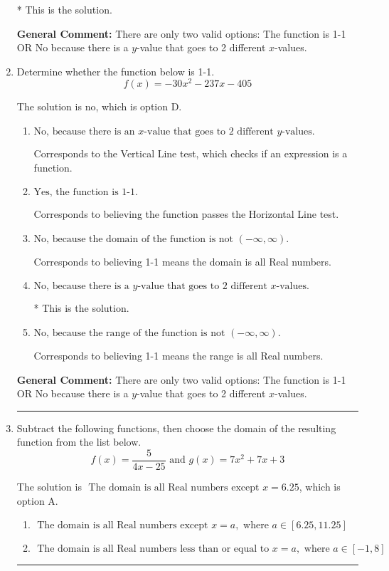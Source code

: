 \documentclass{extbook}[14pt]
\newcommand{\litem}[1]{\item #1

\rule{\textwidth}{0.4pt}}
\begin{document}
\begin{enumerate}
{\begin{enumerate}[label=\Alph*.]
* This is the solution.
\end{enumerate}

\textbf{General Comment:} There are only two valid options: The function is 1-1 OR No because there is a $y$-value that goes to 2 different $x$-values.
}
\litem{
Determine whether the function below is 1-1.
\[ f(x) = -30 x^2 - 237 x - 405 \]

The solution is \( \text{no} \), which is option D.\begin{enumerate}[label=\Alph*.]
\item \( \text{No, because there is an $x$-value that goes to 2 different $y$-values.} \)

Corresponds to the Vertical Line test, which checks if an expression is a function.
\item \( \text{Yes, the function is 1-1.} \)

Corresponds to believing the function passes the Horizontal Line test.
\item \( \text{No, because the domain of the function is not $(-\infty, \infty)$.} \)

Corresponds to believing 1-1 means the domain is all Real numbers.
\item \( \text{No, because there is a $y$-value that goes to 2 different $x$-values.} \)

* This is the solution.
\item \( \text{No, because the range of the function is not $(-\infty, \infty)$.} \)

Corresponds to believing 1-1 means the range is all Real numbers.
\end{enumerate}

\textbf{General Comment:} There are only two valid options: The function is 1-1 OR No because there is a $y$-value that goes to 2 different $x$-values.
}
\litem{
Subtract the following functions, then choose the domain of the resulting function from the list below.
\[ f(x) = \frac{5}{4x-25} \text{ and } g(x) = 7x^{2} +7 x + 3 \]

The solution is \( \text{ The domain is all Real numbers except } x = 6.25 \), which is option A.\begin{enumerate}[label=\Alph*.]
\item \( \text{ The domain is all Real numbers except } x = a, \text{ where } a \in [6.25, 11.25] \)


\item \( \text{ The domain is all Real numbers less than or equal to } x = a, \text{ where } a \in [-1, 8] \)



\end{enumerate}}
\end{enumerate}
\end{document}
